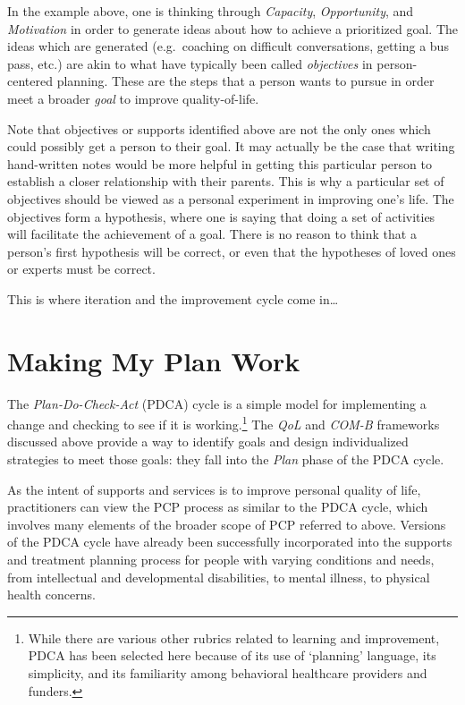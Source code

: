 \documentclass[
]{book}
\begin{document}
In the example above, one is thinking through \emph{Capacity}, \emph{Opportunity}, and \emph{Motivation} in order to generate ideas about how to achieve a prioritized goal. The ideas which are generated (e.g.~coaching on difficult conversations, getting a bus pass, etc.) are akin to what have typically been called \emph{objectives} in person-centered planning. These are the steps that a person wants to pursue in order meet a broader \emph{goal} to improve quality-of-life.

Note that objectives or supports identified above are not the only ones which could possibly get a person to their goal. It may actually be the case that writing hand-written notes would be more helpful in getting this particular person to establish a closer relationship with their parents. This is why a particular set of objectives should be viewed as a personal experiment in improving one's life. The objectives form a hypothesis, where one is saying that doing a set of activities will facilitate the achievement of a goal. There is no reason to think that a person's first hypothesis will be correct, or even that the hypotheses of loved ones or experts must be correct.

This is where iteration and the improvement cycle come in\ldots{}

\hypertarget{pdca_intro}{%
\section{Making My Plan Work}\label{pdca_intro}}

The \emph{Plan-Do-Check-Act} (PDCA) cycle is a simple model for implementing a change and checking to see if it is working.\footnote{While there are various other rubrics related to learning and improvement, PDCA has been selected here because of its use of `planning' language, its simplicity, and its familiarity among behavioral healthcare providers and funders.} The \emph{QoL} and \emph{COM-B} frameworks discussed above provide a way to identify goals and design individualized strategies to meet those goals: they fall into the \emph{Plan} phase of the PDCA cycle.

As the intent of supports and services is to improve personal quality of life, practitioners can view the PCP process as similar to the PDCA cycle, which involves many elements of the broader scope of PCP referred to above. Versions of the PDCA cycle have already been successfully incorporated into the supports and treatment planning process for people with varying conditions and needs, from intellectual and developmental disabilities, to mental illness, to physical health concerns.
\end{document}

